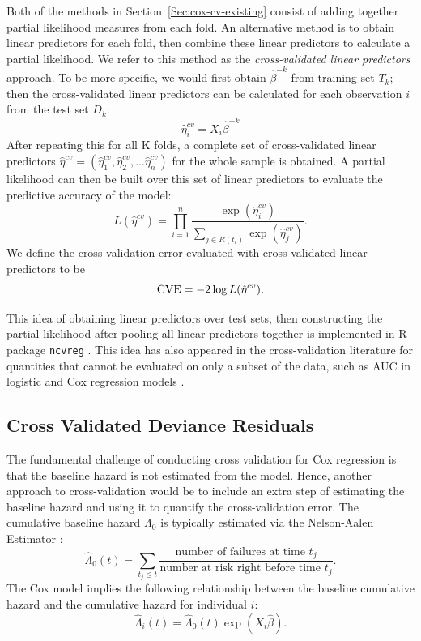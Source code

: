 \par Both of the methods in Section~\ref{Sec:cox-cv-existing} consist of adding together partial likelihood measures from each fold.  An alternative method is to obtain linear predictors for each fold, then combine these linear predictors to calculate a partial likelihood. We refer to this method as the \emph{cross-validated linear predictors} approach. To be more specific, we would first obtain $\hat{\beta}^{-k}$ from training set $T_{k}$; then the cross-validated linear predictors can be calculated for each observation $i$ from the test set $D_k$:  
\begin{equation}
  \label{eq:cv-lp}
  \hat{\eta}^{cv}_{i} = X_{i}\hat{\beta}^{-k}
\end{equation} 
After repeating this for all K folds, a complete set of cross-validated linear predictors $\hat{\eta}^{cv} = ( \hat{\eta}^{cv}_{1},  \hat{\eta}^{cv}_{2} , ...  \hat{\eta}^{cv}_{n})$ for the whole sample is obtained. A partial likelihood can then be built over this set of linear predictors to evaluate the predictive accuracy of the model: 
	\begin{equation} 
	L(\hat{\eta}^{cv}) = \prod_{i=1}^{n} \frac{\exp (\hat{\eta}^{cv}_{i})}{\sum_{ j \in R(t_{i})}\exp (\hat{\eta}^{cv}_{j})}.
	\end{equation}
We define the cross-validation error evaluated with cross-validated linear predictors to be $$\textrm{CVE} = - 2 \log L(\hat{\eta}^{cv}).$$
  
\par This idea of obtaining linear predictors over test sets, then constructing the partial likelihood after pooling all linear predictors together is implemented in R package \texttt{ncvreg} \citep{ncvreg}. This idea has also appeared in the cross-validation literature for quantities that cannot be evaluated on only a subset of the data, such as AUC in logistic and Cox regression models \citep{Parker2007,Simon2011a,Subramanian2011}.

\subsection{Cross Validated Deviance Residuals}

The fundamental challenge of conducting cross validation for Cox regression is that the baseline hazard is not estimated from the model. Hence, another approach to cross-validation would be to include an extra step of estimating the baseline hazard and using it to quantify the cross-validation error. The cumulative baseline hazard $\Lambda_0$ is typically estimated via the Nelson-Aalen Estimator \citep{nelson1969, aalen1978}:
\begin{equation}
  \hat{\Lambda}_{0}(t) = \sum_{t_j \leq t}\frac{\text{number of failures at time } t_j}{\text{number at risk right before time }t_j}.
\end{equation}
The Cox model implies the following relationship between the baseline cumulative hazard and the cumulative hazard for individual $i$:
\begin{equation}
  \hat{\Lambda}_{i}(t) =  \hat{\Lambda}_{0}(t)\exp(X_i\hat\beta).
\end{equation}

